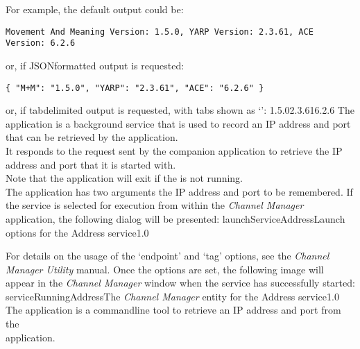 \insertFullUtilityParameters{}
For example, the default output could be:
\outputBegin
\begin{verbatim}
Movement And Meaning Version: 1.5.0, YARP Version: 2.3.61, ACE Version: 6.2.6
\end{verbatim}
\outputEnd{}
or, if JSON\longDash{}formatted output is requested:
\outputBegin
\begin{verbatim}
{ "M+M": "1.5.0", "YARP": "2.3.61", "ACE": "6.2.6" }
\end{verbatim}
\outputEnd{}
or, if tab\longDash{}delimited output is requested, with tabs shown as `\tabSymbol':
\outputBegin{}
1.5.0\pseudotab{}2.3.61\pseudotab{}6.2.6
\outputEnd
{}
\secondaryEnd
\condPage
{}
The  application is a background service that is used to
record an IP address and port that can be retrieved by the 
application.\\

It responds to the  request sent by the
companion application  to retrieve the IP address and port
that it is started with.\\

Note that the application will exit if the
 is not running.\\

The application has two arguments \longDash{} the IP address and port to be remembered.
\insertAutoAppParameters
{}
\condPage
If the service is selected for execution from within the \emph{Channel Manager}
application, the following dialog will be presented:
%
{launchServiceAddress}{Launch options for the Address service}{1.0}

For details on the usage of the `endpoint' and `tag' options, see the \emph{Channel
Manager Utility} manual.
Once the options are set, the following image will appear in the \emph{Channel Manager}
window when the service has successfully started:
%
{serviceRunningAddress}{The \emph{Channel Manager} entity for the Address service}{1.0}
\condPage
{}
The  application is a command\longDash{}line tool to
retrieve an IP address and port from the\\
 application.\\

